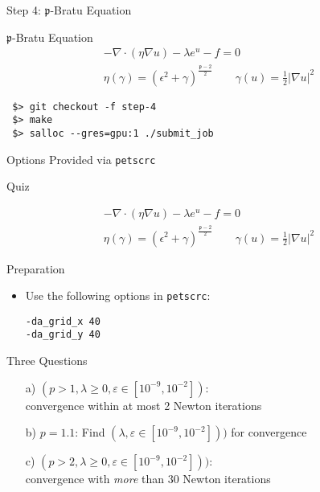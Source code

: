 


\begin{frame}[fragile]{Step 4: $\mathfrak{p}$-Bratu Equation}

  \begin{block}{$\mathfrak{p}$-Bratu Equation}
    \begin{gather*}
      -\nabla \cdot (\eta \nabla u) - \lambda e^u - f = 0 \\
      \eta(\gamma) = (\epsilon^2 + \gamma)^{\frac{\mathfrak{p}-2}{2}} \qquad \gamma(u) = \frac{1}{2} \vert\nabla u\vert^2
    \end{gather*}

 \begin{lstlisting}
 $> git checkout -f step-4
 $> make
 $> salloc --gres=gpu:1 ./submit_job
 \end{lstlisting}
  \end{block}

  \begin{block}{Options}
    Provided via \lstinline|petscrc|
  \end{block}

\end{frame}


\begin{frame}[fragile]{Quiz}

    \begin{gather*}
      -\nabla \cdot (\eta \nabla u) - \lambda e^u - f = 0 \\
      \eta(\gamma) = (\epsilon^2 + \gamma)^{\frac{\mathfrak{p}-2}{2}} \qquad \gamma(u) = \frac{1}{2} \vert\nabla u\vert^2
    \end{gather*}

  \begin{block}{Preparation}
    \begin{itemize}
     \item Use the following options in \lstinline|petscrc|:
 \begin{lstlisting}
-da_grid_x 40 
-da_grid_y 40
 \end{lstlisting}
    \end{itemize}
  \end{block}

  \begin{block}{Three Questions}
    \begin{itemize}
     \item[a)] $(p>1, \lambda \geq 0, \varepsilon \in [10^{-9}, 10^{-2}])$: \\ convergence within at most 2 Newton iterations
     \item[b)] $p=1.1$: Find $(\lambda, \varepsilon \in [10^{-9}, 10^{-2}]))$ for convergence
     \item[c)] $(p>2,\lambda \geq 0, \varepsilon \in [10^{-9}, 10^{-2}]))$: \\ convergence with \emph{more} than 30 Newton iterations
    \end{itemize}
  \end{block}

\end{frame}


